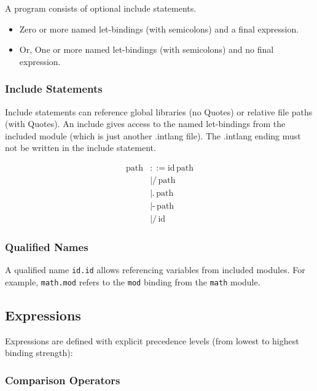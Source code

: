 \documentclass[12pt]{article}
\begin{document}
A program consists of optional include statements. 

\begin{itemize}
  \item Zero or more named let-bindings (with semicolons) and a final expression.
  \item Or, One or more named let-bindings (with semicolons) and no final expression.
\end{itemize}


\subsubsection{Include Statements}

Include statements can reference global libraries (no Quotes) or relative file paths (with Quotes). An include gives access to the named let-bindings from the included module (which is just another .intlang file). The .intlang ending must not be written in the include statement.

\begin{align*}
\text{path} &::= \text{id} \, \text{path} \\
            &\mid \texttt{/} \, \text{path} \\
            &\mid \texttt{.} \, \text{path} \\
            &\mid \texttt{-} \, \text{path} \\
            &\mid \texttt{/} \, \text{id}
\end{align*}

\subsubsection{Qualified Names}

A qualified name \texttt{id.id} allows referencing variables from included modules. For example, \texttt{math.mod} refers to the \texttt{mod} binding from the \texttt{math} module.

\subsection{Expressions}

Expressions are defined with explicit precedence levels (from lowest to highest binding strength):

\subsubsection{Comparison Operators}
\end{document}
